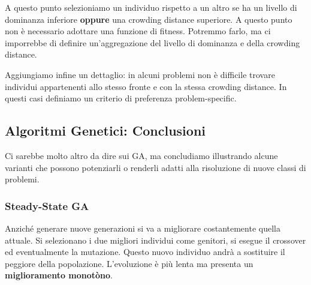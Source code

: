 \begin{itemize}
            A questo punto selezioniamo un individuo rispetto a un altro se ha un livello di dominanza inferiore \textbf{oppure} una crowding distance superiore. A questo punto non è necessario adottare una funzione di fitness. Potremmo farlo, ma ci imporrebbe di definire un'aggregazione del livello di dominanza e della crowding distance.
            
            Aggiungiamo infine un dettaglio: in alcuni problemi non è difficile trovare individui appartenenti allo stesso fronte e con la stessa crowding distance. In questi casi definiamo un criterio di preferenza problem-specific.
        \end{itemize}
        
    \subsection{Algoritmi Genetici: Conclusioni}
        Ci sarebbe molto altro da dire sui GA, ma concludiamo illustrando alcune varianti che possono potenziarli o renderli adatti alla risoluzione di nuove classi di problemi.
        
        \subsubsection{Steady-State GA}
            Anziché generare nuove generazioni si va a migliorare costantemente quella attuale. Si selezionano i due migliori individui come genitori, si esegue il crossover ed eventualmente la mutazione. Questo nuovo individuo andrà a sostituire il peggiore della popolazione. L'evoluzione è più lenta ma presenta un \textbf{miglioramento monotòno}.
            
